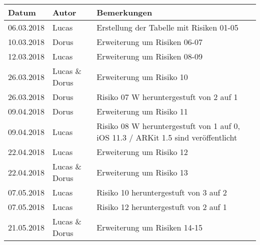 \begin{table}
	\begin{tabular}{llp{10cm}}
		\hline
		\textbf{Datum} & \textbf{Autor} & \textbf{Bemerkungen} \\
		\hline
		06.03.2018 & Lucas & Erstellung der Tabelle mit Risiken 01-05 \\
		10.03.2018 & Dorus & Erweiterung um Risiken 06-07 \\
		12.03.2018 & Lucas & Erweiterung um Risiken 08-09 \\
		26.03.2018 & Lucas \& Dorus & Erweiterung um Risiko 10 \\
		26.03.2018 & Dorus & Risiko 07 W heruntergestuft von 2 auf 1 \\
		09.04.2018 & Dorus & Erweiterung um Risiko 11 \\
		09.04.2018 & Lucas & Risiko 08 W heruntergestuft von 1 auf 0, iOS 11.3 / ARKit 1.5 sind veröffentlicht \\
		22.04.2018 & Lucas & Erweiterung um Risiko 12 \\
		22.04.2018 & Lucas \& Dorus & Erweiterung um Risiko 13 \\
		07.05.2018 & Lucas & Risiko 10 heruntergestuft von 3 auf 2 \\
		07.05.2018 & Lucas & Risiko 12 heruntergestuft von 2 auf 1 \\
		21.05.2018 & Lucas \& Dorus & Erweiterung um Risiken 14-15 \\
		\hline
	\end{tabular}
\end{table}

